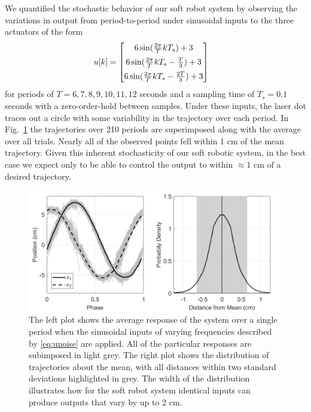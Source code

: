 We quantified the stochastic behavior of our soft robot system by observing the variations in output from period-to-period under sinusoidal inputs to the three actuators of the form
\begin{align} 
    u[k] &= \begin{bmatrix} 6 \sin ( \frac{2 \pi}{T} k T_s ) + 3 \vspace{5pt} \\ 
    6 \sin ( \frac{2 \pi}{T} k T_s - \frac{T}{3} ) + 3 \vspace{5pt} \\ 
    6 \sin ( \frac{2 \pi}{T} k T_s  - \frac{2T}{3}) + 3\end{bmatrix}
    \label{eq:unoise}
\end{align}
for periods of $T = 6,7,8,9,10,11,12$ seconds and a sampling time of $T_s = 0.1$ seconds with a zero-order-hold between samples. 
Under these inputs, the laser dot traces out a circle with some variability in the trajectory over each period.
In Fig.~\ref{fig:noise} the trajectories over 210 periods are superimposed along with the average over all trials.
Nearly all of the observed points fell within 1 cm of the mean trajectory.
Given this inherent stochasticity of our soft robotic system, in the best case we expect only to be able to control the output to within $\approx 1$ cm of a desired trajectory.

\begin{figure}
    \centering
    \includegraphics[width=\linewidth]{figures/noise.png}
    \caption{The left plot shows the average response of the system over a single period when the sinusoidal inputs of varying frequencies described by \eqref{eq:unoise} are applied. All of the particular responses are subimposed in light grey.
    The right plot shows the distribution of trajectories about the mean, with all distances within two standard deviations highlighted in grey. The width of the distribution illustrates how for the soft robot system identical inputs can produce outputs that vary by up to 2 cm.}
    \label{fig:noise}
\end{figure}

